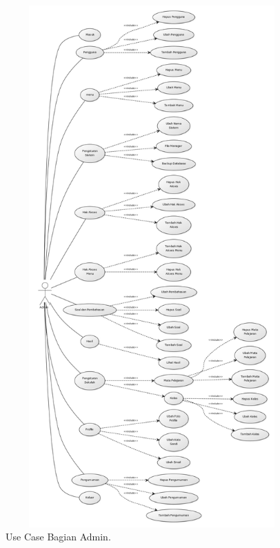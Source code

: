 \documentclass{scrreprt}
\begin{document}
		\begin{figure}
			\includegraphics[width=18cm, height=20cm]{usecase-admin.jpg}
			\caption{Use Case Bagian Admin.}
		\end{figure}
	
\end{document}
